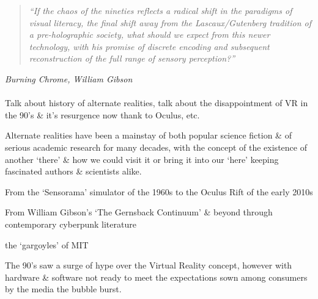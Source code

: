 \begin{quote}
	\textit{``If the chaos of the nineties reflects a radical shift in the paradigms of visual literacy, the final shift away from the Lascaux/Gutenberg tradition of a pre-holographic society, what should we expect from this newer technology, with his promise of discrete encoding and subsequent reconstruction of the full range of sensory perception?''}
\end{quote}
\hfill \textit{Burning Chrome, William Gibson}
\\
\\



Talk about history of alternate realities, talk about the disappointment of VR in the 90's \& it's resurgence now thank to Oculus, etc.






Alternate realities have been a mainstay of both popular science fiction \& of serious academic research for many decades, with the concept of the existence of another `there' \& how we could visit it or bring it into our `here'
keeping fascinated authors \& scientists alike.

From the `Sensorama' simulator of the 1960s to the Oculus Rift of the early 2010s

From William Gibson's `The Gernsback Continuum' \& beyond through contemporary cyberpunk literature

the `gargoyles' of MIT


The 90's saw a surge of hype over the Virtual Reality concept, however with hardware \& software not ready to meet the expectations sown among consumers by the media the bubble burst.

